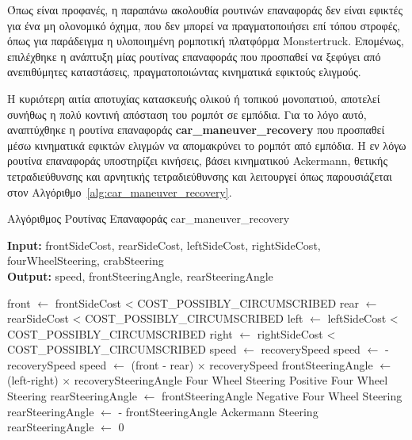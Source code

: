 \bigskip
Όπως είναι προφανές, η παραπάνω ακολουθία ρουτινών επαναφοράς δεν είναι εφικτές για ένα μη ολονομικό όχημα, που δεν μπορεί να πραγματοποιήσει επί τόπου στροφές, όπως για παράδειγμα η υλοποιημένη ρομποτική πλατφόρμα Monstertruck. Επομένως, επιλέχθηκε η ανάπτυξη μίας ρουτίνας επαναφοράς που προσπαθεί να ξεφύγει από ανεπιθύμητες καταστάσεις, πραγματοποιώντας κινηματικά εφικτούς ελιγμούς.

\bigskip
Η κυριότερη αιτία αποτυχίας κατασκευής ολικού ή τοπικού μονοπατιού, αποτελεί συνήθως η πολύ κοντινή απόσταση του ρομπότ σε εμπόδια. Για το λόγο αυτό, αναπτύχθηκε η ρουτίνα επαναφοράς \textbf{car{\_}maneuver{\_}recovery} που προσπαθεί μέσω κινηματικά εφικτών ελιγμών να απομακρύνει το ρομπότ από εμπόδια. Η εν λόγω ρουτίνα επαναφοράς υποστηρίζει κινήσεις, βάσει κινηματικού Ackermann, θετικής τετραδιεύθυνσης και αρνητικής τετραδιεύθυνσης και λειτουργεί όπως παρουσιάζεται στον Αλγόριθμο~\ref{alg:car_maneuver_recovery}.

\newpage
\begin{algorithm}[!ht]
	\caption{Αλγόριθμος Ρουτίνας Επαναφοράς car{\_}maneuver{\_}recovery}
	\label{alg:car_maneuver_recovery}
	\textbf{Input:} frontSideCost, rearSideCost, leftSideCost, rightSideCost, fourWheelSteering, crabSteering\\
	\textbf{Output:} speed, frontSteeringAngle, rearSteeringAngle
	\begin{algorithmic}[1]
		\State front $\leftarrow$ frontSideCost < COST{\_}POSSIBLY{\_}CIRCUMSCRIBED
		\State rear  $\leftarrow$ rearSideCost < COST{\_}POSSIBLY{\_}CIRCUMSCRIBED
		\State left  $\leftarrow$ leftSideCost < COST{\_}POSSIBLY{\_}CIRCUMSCRIBED
		\State right $\leftarrow$ rightSideCost < COST{\_}POSSIBLY{\_}CIRCUMSCRIBED
				\State speed $\leftarrow$ recoverySpeed
			\Else
				\State speed $\leftarrow$ -recoverySpeed
			\EndIf
		\Else
			\State speed $\leftarrow$ (front - rear) $\times$ recoverySpeed
		\EndIf
		\State frontSteeringAngle $\leftarrow$ (left-right) $\times$ recoverySteeringAngle
			\Comment Four Wheel Steering
			 \Comment Positive Four Wheel Steering
				\State rearSteeringAngle $\leftarrow$ frontSteeringAngle
			\Else \Comment Negative Four Wheel Steering
				\State rearSteeringAngle $\leftarrow$ - frontSteeringAngle
			\EndIf
		\Else \Comment Ackermann Steering
			\State rearSteeringAngle $\leftarrow$ 0
		\EndIf
	\end{algorithmic}
\end{algorithm}

